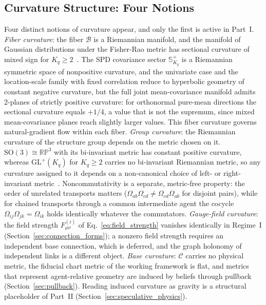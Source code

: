 \documentclass[11pt]{article}
\begin{document}
\subsection{Curvature Structure: Four Notions}

Four distinct notions of curvature appear, and only the first is active in Part~I. \emph{Fiber curvature}: the fiber $\mathcal{B}$ is a Riemannian manifold, and the manifold of Gaussian distributions under the Fisher-Rao metric has sectional curvature of mixed sign for $K_q \geq 2$~\cite{Skovgaard1984}. The SPD covariance sector $\mathbb{S}^+_{K_q}$ is a Riemannian symmetric space of nonpositive curvature, and the univariate case and the location-scale family with fixed correlation reduce to hyperbolic geometry of constant negative curvature, but the full joint mean-covariance manifold admits 2-planes of strictly positive curvature: for orthonormal pure-mean directions the sectional curvature equals $+1/4$, a value that is not the supremum, since mixed mean-covariance planes reach slightly larger values. This fiber curvature governs natural-gradient flow within each fiber. \emph{Group curvature}: the Riemannian curvature of the structure group depends on the metric chosen on it. $\mathrm{SO}(3) \cong \mathbb{RP}^3$ with its bi-invariant metric has constant positive curvature, whereas $\mathrm{GL}^+(K_q)$ for $K_q \geq 2$ carries no bi-invariant Riemannian metric, so any curvature assigned to it depends on a non-canonical choice of left- or right-invariant metric~\cite{Milnor1976}. Noncommutativity is a separate, metric-free property: the order of unrelated transports matters ($\Omega_{ab}\Omega_{cd} \neq \Omega_{cd}\Omega_{ab}$ for disjoint pairs), while for chained transports through a common intermediate agent the cocycle $\Omega_{ij}\Omega_{jk} = \Omega_{ik}$ holds identically whatever the commutators. \emph{Gauge-field curvature}: the field strength $F^{(i)}_{\mu\nu}$ of Eq.~\eqref{eq:field_strength} vanishes identically in Regime~I (Section~\ref{sec:connection_forms}); a nonzero field strength requires an independent base connection, which is deferred, and the graph holonomy of independent links is a different object. \emph{Base curvature}: $\mathcal{C}$ carries no physical metric, the fiducial chart metric of the working framework is flat, and metrics that represent agent-relative geometry are induced by beliefs through pullback (Section~\ref{sec:pullback}). Reading induced curvature as gravity is a structural placeholder of Part~II (Section~\ref{sec:speculative_physics}).
\end{document}
